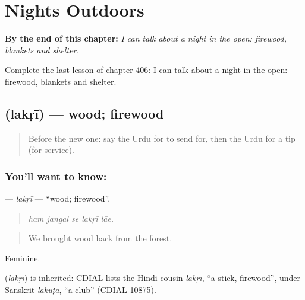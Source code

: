 
\chapter{Nights Outdoors}
\label{ch:ur-nights-outdoors}

\begin{chapteropening}
\textbf{By the end of this chapter:} \emph{I can talk about a night in the open: firewood, blankets and shelter.}

Complete the last lesson of chapter 406: I can talk about a night in the open: firewood, blankets and shelter.
\end{chapteropening}

\section[\texorpdfstring{\ur{لکڑی} (lakṛī)}{لکڑی (lakṛī)}]{ (lakṛī) — wood; firewood}

\label{lesson:UR-C406-lakri}



\begin{quote}
Before the new one: say the Urdu for to send for, then the Urdu for a tip (for service).
\end{quote}

\subsection*{You'll want to know: }
\textbf{} — \emph{lakṛī} — \textquotedblleft{}wood; firewood\textquotedblright{}.

\begin{quote}
    
\end{quote}

\begin{quote}
\emph{ham jangal se lakṛī lāe.}
\end{quote}

\begin{quote}
We brought wood back from the forest.
\end{quote}

Feminine.

\begin{cousinweb}
\textbf{} (\emph{lakṛī}) is inherited: CDIAL lists the Hindi cousin \emph{lakṛī}, \textquotedblleft{}a stick, firewood\textquotedblright{}, under Sanskrit \emph{lakuṭa}, \textquotedblleft{}a club\textquotedblright{} (CDIAL 10875).
\end{cousinweb}

